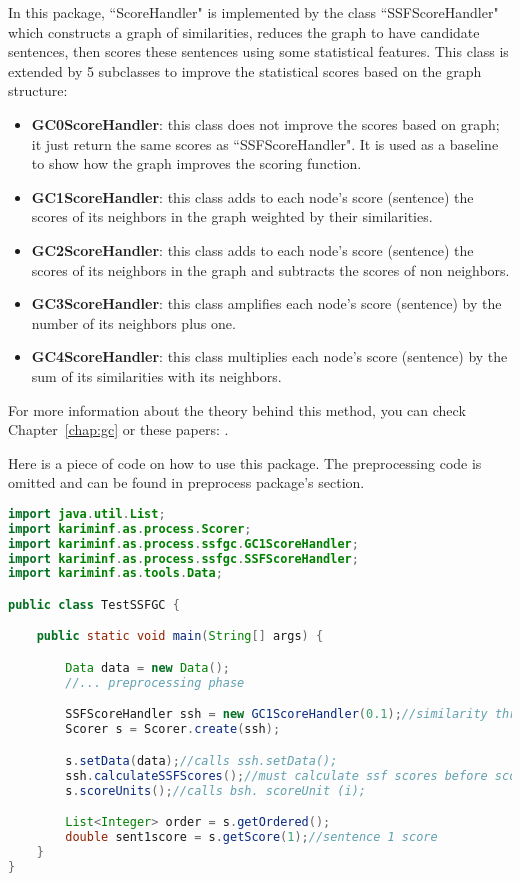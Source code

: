 In this package, ``ScoreHandler" is implemented by the class ``SSFScoreHandler" which constructs a graph of similarities, reduces the graph to have candidate sentences, then scores these sentences using some statistical features. 
This class is extended by 5 subclasses to improve the statistical scores based on the graph structure:
\begin{itemize}
	\item \textbf{GC0ScoreHandler}: this class does not improve the scores based on graph; it just return the same scores as ``SSFScoreHandler". 
	It is used as a baseline to show how the graph improves the scoring function.
	
	\item \textbf{GC1ScoreHandler}: this class adds to each node's score (sentence) the scores of its neighbors in the graph weighted by their similarities.
	
	\item \textbf{GC2ScoreHandler}: this class adds to each node's score (sentence) the scores of its neighbors in the graph and subtracts the scores of non neighbors.
	
	\item \textbf{GC3ScoreHandler}: this class amplifies each node's score (sentence) by the number of its neighbors plus one.
	
	\item \textbf{GC4ScoreHandler}: this class multiplies each node's score (sentence) by the sum of its similarities with its neighbors. 
	
\end{itemize}
For more information about the theory behind this method, you can check Chapter~\ref{chap:gc} or these papers: \citep{18-aries-al,21-aries-al}.

Here is a piece of code on how to use this package. 
The preprocessing code is omitted and can be found in preprocess package's section.  
\begin{lstlisting}[language={Java}, style=codeStyle]
import java.util.List;
import kariminf.as.process.Scorer;
import kariminf.as.process.ssfgc.GC1ScoreHandler;
import kariminf.as.process.ssfgc.SSFScoreHandler;
import kariminf.as.tools.Data;

public class TestSSFGC {

    public static void main(String[] args) {

        Data data = new Data();
        //... preprocessing phase

        SSFScoreHandler ssh = new GC1ScoreHandler(0.1);//similarity threshold = 0.1
        Scorer s = Scorer.create(ssh);

        s.setData(data);//calls ssh.setData();
        ssh.calculateSSFScores();//must calculate ssf scores before scoring
        s.scoreUnits();//calls bsh. scoreUnit (i);

        List<Integer> order = s.getOrdered();
        double sent1score = s.getScore(1);//sentence 1 score
    }
}

\end{lstlisting}

